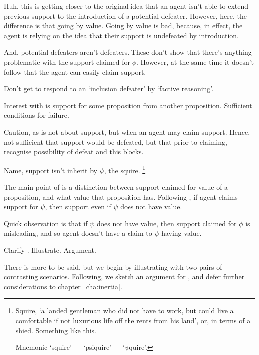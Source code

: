 \begin{note}[\nI{-}]
  Huh, this is getting closer to the original idea that an agent isn't able to extend previous support to the introduction of a potential defeater.
  However, here, the difference is that going by value.
  Going by value is bad, because, in effect, the agent is relying on the idea that their support is undefeated by introduction.

  And, potential defeaters aren't defeaters.
  These don't show that there's anything problematic with the support claimed for \(\phi\).
  However, at the same time it doesn't follow that the agent can easily claim support.

  Don't get to respond to an `inclusion defeater' by `factive reasoning'.
\end{note}

\begin{note}
  Interest with \nI{} is support for some proposition from another proposition.
  Sufficient conditions for failure.

  Caution, as \nI{} is not about support, but when an agent may claim support.
  Hence, not sufficient that support would be defeated, but that prior to claiming, recognise possibility of defeat and this blocks.

  Name, support isn't inherit by \(\psi\), the squire.\nolinebreak
  \footnote{
    Squire, `a landed gentleman who did not have to work, but could live a comfortable if not luxurious life off the rents from his land', or, in terms of a shied.
    Something like this.

    Mnemonic `squire' --- `psiquire' --- `\(\psi\)quire'.
  }

  The main point of \nI{} is a distinction between support claimed for value of a proposition, and what value that proposition has.
  Following \eiS{}, if agent claims support for \(\psi\), then support even if \(\psi\) does not have value.

  {\color{red}
    Quick observation is that if \(\psi\) does not have value, then support claimed for \(\phi\) is misleading, and so agent doesn't have a claim to \(\psi\) having value.
    }
\end{note}

\begin{note}[Plan]
  Clarify \nI{}.
  Illustrate.
  Argument.

  {
    \color{red}
    There is more to be said, but we begin by illustrating \nI{} with two pairs of contrasting scenarios.
    Following, we sketch an argument for \nI{}, and defer further considerations to chapter~\ref{cha:inertia}.
  }

\end{note}


